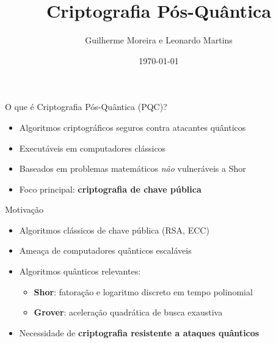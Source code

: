\documentclass[aspectratio=169]{beamer}
\title[Criptografia Pós-Quântica]{Criptografia Pós-Quântica}
\author{Guilherme Moreira e Leonardo Martins}
\date{\today}
\begin{document}
	
	\begin{frame}
		\titlepage
	\end{frame}
	
	\begin{frame}{O que é Criptografia Pós-Quântica (PQC)?}
		\begin{itemize}
			\item Algoritmos criptográficos seguros contra atacantes quânticos
			\item Executáveis em computadores clássicos
			\item Baseados em problemas matemáticos \emph{não} vulneráveis a Shor
			\item Foco principal: \textbf{criptografia de chave pública}
		\end{itemize}
	\end{frame}
	
	\begin{frame}{Motivação}
		\begin{itemize}
			\item Algoritmos clássicos de chave pública (RSA, ECC)
			\item Ameaça de computadores quânticos escaláveis
			\item Algoritmos quânticos relevantes:
			\begin{itemize}
				\item \textbf{Shor}: fatoração e logaritmo discreto em tempo polinomial
				\item \textbf{Grover}: aceleração quadrática de busca exaustiva
			\end{itemize}
			\item Necessidade de \textbf{criptografia resistente a ataques quânticos}
		\end{itemize}
	\end{frame}
	
\end{document}
